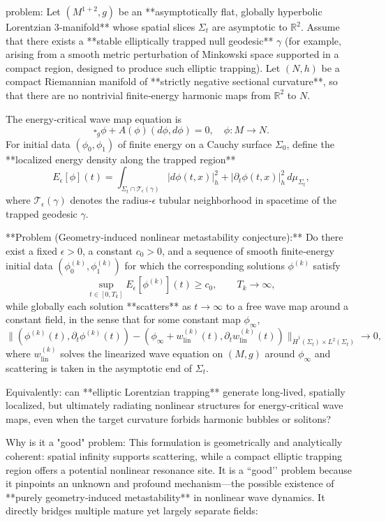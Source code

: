 problem:  
Let \((M^{1+2}, g)\) be an **asymptotically flat, globally hyperbolic Lorentzian 3‑manifold** whose spatial slices \(\Sigma_t\) are asymptotic to \(\mathbb{R}^2\).  
Assume that there exists a **stable elliptically trapped null geodesic** \(\gamma\) (for example, arising from a smooth metric perturbation of Minkowski space supported in a compact region, designed to produce such elliptic trapping).  
Let \((N, h)\) be a compact Riemannian manifold of **strictly negative sectional curvature**, so that there are no nontrivial finite‑energy harmonic maps from \(\mathbb{R}^2\) to \(N\).  

The energy‑critical wave map equation is
\[
\square_g \phi + A(\phi)(d\phi,d\phi) = 0, \quad \phi : M \to N.
\]
For initial data \((\phi_0,\phi_1)\) of finite energy on a Cauchy surface \(\Sigma_0\),
define the **localized energy density along the trapped region**
\[
E_\epsilon[\phi](t) = \int_{\Sigma_t \cap \mathcal{T}_\epsilon(\gamma)} |d\phi(t,x)|_h^2 + |\partial_t \phi(t,x)|_h^2 \, d\mu_{\Sigma_t},
\]
where \(\mathcal{T}_\epsilon(\gamma)\) denotes the radius‑\(\epsilon\) tubular neighborhood in spacetime of the trapped geodesic \(\gamma\).

**Problem (Geometry‑induced nonlinear metastability conjecture):**  
Do there exist a fixed \(\epsilon >0\), a constant \(c_0>0\), and a sequence of smooth finite‑energy initial data \((\phi_0^{(k)},\phi_1^{(k)})\) for which the corresponding solutions \(\phi^{(k)}\) satisfy
\[
\sup_{t\in [0, T_k]} E_\epsilon[\phi^{(k)}](t) \ge c_0,
\qquad T_k \to \infty,
\]
while globally each solution **scatters** as \(t\to\infty\) to a free wave map around a constant field, in the sense that for some constant map \(\phi_\infty\),
\[
\|(\phi^{(k)}(t),\partial_t \phi^{(k)}(t)) - (\phi_\infty + w_{\text{lin}}^{(k)}(t),\partial_t w_{\text{lin}}^{(k)}(t))\|_{\dot H^1(\Sigma_t)\times L^2(\Sigma_t)} \to 0,
\]
where \(w_{\text{lin}}^{(k)}\) solves the linearized wave equation on \((M,g)\) around \(\phi_\infty\) and scattering is taken in the asymptotic end of \(\Sigma_t\).  

Equivalently: can **elliptic Lorentzian trapping** generate long‑lived, spatially localized, but ultimately radiating nonlinear structures for energy‑critical wave maps, even when the target curvature forbids harmonic bubbles or solitons?

Why is it a "good" problem:  
This formulation is geometrically and analytically coherent: spatial infinity supports scattering, while a compact elliptic trapping region offers a potential nonlinear resonance site.  
It is a “good’’ problem because it pinpoints an unknown and profound mechanism—the possible existence of **purely geometry‑induced metastability** in nonlinear wave dynamics. It directly bridges multiple mature yet largely separate fields:

